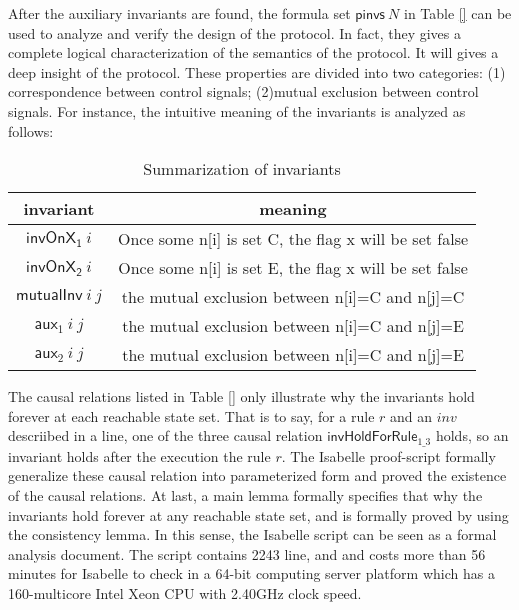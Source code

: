 \documentclass{llncs}
\begin{document}
After the auxiliary invariants are found,  the formula set $\mathsf{pinvs}~ N$ in Table \ref{} can be used to analyze
 and verify the design  of the protocol. In fact, they gives a complete
logical characterization of the semantics of the protocol. It will gives a deep insight of the protocol. These properties are divided into two categories: (1) correspondence between
control signals; (2)mutual exclusion between control signals. For instance, the intuitive meaning of the invariants is analyzed as follows:

\begin{table}[htbp] \label{Summarization of invariants}
\centering \caption{Summarization of invariants}
\begin{tabular}{|c|c| }
\hline
invariant &  meaning  \\
\hline
$\mathsf{invOnX_1} ~i$& Once some n[i] is set C, the flag x will be set false \\
\hline
$\mathsf{invOnX_2} ~i$&  Once some n[i] is set E, the flag x will be set false \\
\hline
$\mathsf{mutualInv}~ i ~j$ &  the mutual exclusion between n[i]=C and n[j]=C \\
\hline
$\mathsf{aux}_1~ i ~j$ &  the mutual exclusion between n[i]=C and n[j]=E \\
\hline
$\mathsf{aux}_2~ i ~j$ &  the mutual exclusion between n[i]=C and n[j]=E \\
\hline
\end{tabular}
\end{table}
The causal relations listed in Table \ref{} only illustrate why the invariants hold forever at each reachable state set.
That is to say, for a rule $r$ and an $inv$ descriibed in a line, one of the three causal relation $\mathsf{invHoldForRule}_{1\_3}$ holds, so an invariant holds after the execution the rule $r$. The Isabelle proof-script formally generalize these causal relation into parameterized form and proved the existence of the  causal relations. At last, a main lemma formally specifies that why the invariants hold forever at any reachable state set, and is formally proved by using the consistency lemma. In this sense, the Isabelle script can be seen as  a formal analysis document. The script contains 2243 line, and and costs more than 56
minutes for Isabelle to check in a 64-bit computing server platform which has a
160-multicore Intel Xeon CPU with 2.40GHz clock speed.
\end{document}

